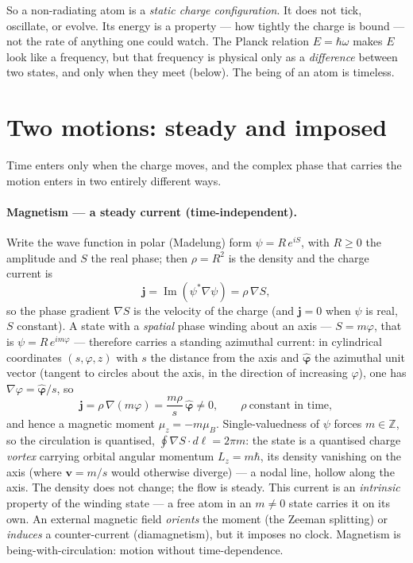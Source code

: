 \documentclass[11pt]{article}
\begin{document}
So a non-radiating atom is a \emph{static charge configuration}. It does not tick, oscillate, or evolve. Its
energy is a property --- how tightly the charge is bound --- not the rate of anything one could watch. The
Planck relation $E=\hbar\omega$ makes $E$ look like a frequency, but that frequency is physical only as a
\emph{difference} between two states, and only when they meet (below). The being of an atom is timeless.

\section{Two motions: steady and imposed}

Time enters only when the charge moves, and the complex phase that carries the motion enters in two entirely
different ways.

\paragraph{Magnetism --- a steady current (time-independent).} Write the wave function in polar (Madelung)
form $\psi=R\,e^{iS}$, with $R\geq0$ the amplitude and $S$ the real phase; then $\rho=R^2$ is the density and
the charge current is
\[
\mathbf j=\operatorname{Im}(\psi^*\nabla\psi)=\rho\,\nabla S ,
\]
so the phase gradient $\nabla S$ is the velocity of the charge (and $\mathbf j=0$ when $\psi$ is real,
$S$ constant). A state with a \emph{spatial} phase winding about an axis --- $S=m\varphi$, that is
$\psi=R\,e^{im\varphi}$ --- therefore carries a standing azimuthal current: in cylindrical coordinates
$(s,\varphi,z)$ with $s$ the distance from the axis and $\hat{\boldsymbol\varphi}$ the azimuthal unit vector
(tangent to circles about the axis, in the direction of increasing $\varphi$), one has
$\nabla\varphi=\hat{\boldsymbol\varphi}/s$, so
\[
\mathbf j=\rho\,\nabla(m\varphi)=\frac{m\rho}{s}\,\hat{\boldsymbol\varphi}\neq 0 ,\qquad
\rho\ \text{constant in time},
\]
and hence a magnetic moment $\mu_z=-m\mu_B$. Single-valuedness of $\psi$ forces $m\in\mathbb Z$, so the
circulation is quantised, $\oint\nabla S\cdot d\boldsymbol\ell=2\pi m$: the state is a quantised charge
\emph{vortex} carrying orbital angular momentum $L_z=m\hbar$, its density vanishing on the axis (where
$\mathbf v=m/s$ would otherwise diverge) --- a nodal line, hollow along the axis. The density does not change;
the flow is steady. This current is
an \emph{intrinsic} property of the winding state --- a free atom in an $m\neq0$ state carries it on its own.
An external magnetic field \emph{orients} the moment (the Zeeman splitting) or \emph{induces} a counter-current
(diamagnetism), but it imposes no clock. Magnetism is being-with-circulation: motion without time-dependence.
\end{document}

